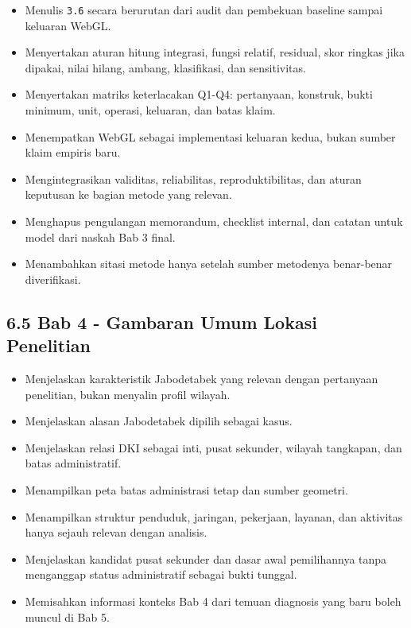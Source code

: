 \documentclass[
  indonesian,
  11pt,
]{article}
\providecommand{\tightlist}{%
  \setlength{\itemsep}{0pt}\setlength{\parskip}{0pt}}
\renewcommand{\tightlist}{%
  \setlength{\itemsep}{0.22em}%
  \setlength{\parskip}{0pt}%
}
\begin{document}
\begin{itemize}
  Menjelaskan bentuk bukti D/A/S/P/\(\varnothing\), asumsi estimasi,
  pemeriksaan independen, lisensi, serta privasi.
\item[$\square$]
  Menulis \texttt{3.6} secara berurutan dari audit dan pembekuan
  baseline sampai keluaran WebGL.
\item[$\square$]
  Menyertakan aturan hitung integrasi, fungsi relatif, residual, skor
  ringkas jika dipakai, nilai hilang, ambang, klasifikasi, dan
  sensitivitas.
\item[$\square$]
  Menyertakan matriks keterlacakan Q1-Q4: pertanyaan, konstruk, bukti
  minimum, unit, operasi, keluaran, dan batas klaim.
\item[$\square$]
  Menempatkan WebGL sebagai implementasi keluaran kedua, bukan sumber
  klaim empiris baru.
\item[$\square$]
  Mengintegrasikan validitas, reliabilitas, reproduktibilitas, dan
  aturan keputusan ke bagian metode yang relevan.
\item[$\square$]
  Menghapus pengulangan memorandum, checklist internal, dan catatan
  untuk model dari naskah Bab 3 final.
\item[$\square$]
  Menambahkan sitasi metode hanya setelah sumber metodenya benar-benar
  diverifikasi.
\end{itemize}

\subsection{6.5 Bab 4 - Gambaran Umum Lokasi
Penelitian}\label{bab-4---gambaran-umum-lokasi-penelitian}

\begin{itemize}
\tightlist
\item[$\square$]
  Menjelaskan karakteristik Jabodetabek yang relevan dengan pertanyaan
  penelitian, bukan menyalin profil wilayah.
\item[$\square$]
  Menjelaskan alasan Jabodetabek dipilih sebagai kasus.
\item[$\square$]
  Menjelaskan relasi DKI sebagai inti, pusat sekunder, wilayah
  tangkapan, dan batas administratif.
\item[$\square$]
  Menampilkan peta batas administrasi tetap dan sumber geometri.
\item[$\square$]
  Menampilkan struktur penduduk, jaringan, pekerjaan, layanan, dan
  aktivitas hanya sejauh relevan dengan analisis.
\item[$\square$]
  Menjelaskan kandidat pusat sekunder dan dasar awal pemilihannya tanpa
  menganggap status administratif sebagai bukti tunggal.
\item[$\square$]
  Memisahkan informasi konteks Bab 4 dari temuan diagnosis yang baru
  boleh muncul di Bab 5.
\end{itemize}
\end{document}
